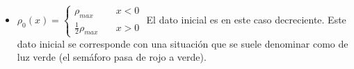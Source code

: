 \begin{ejercicio}
\begin{enumerate}
\begin{itemize}
\begin{figure}[H]
\begin{center}
\begin{tikzpicture}[x=0.75pt,y=0.75pt,yscale=-1,xscale=1]
                    \end{tikzpicture}
                \end{center}
            \end{figure}
            Las líneas amarillas muestran dónde se pueden meter las ondas de rarefacción. La frontera está delimitada por 
            $x = 0$ y por $x = - u_{max} t$. De esta manera, los tramos son $x<-u_{max}t$, $-u_{max} t < x < 0$ y $x > 0$.
            De esta manera, las ondas de rarefacción son:
            $$\rho(t,x) = \begin{cases}
                \frac{1}{2} \rho_{max} \quad& x < -u_{max} t \\
                \frac{x}{t} \quad & -u_{max} t \leq x < 0 \\
                \rho_{max} \quad& x > 0
            \end{cases}$$
            \item $\rho_0(x) = \begin{cases}
                \rho_{max} \quad& x < 0 \\
                \frac{1}{2} \rho_{max} \quad& x > 0
            \end{cases}$
            El dato inicial es en este caso decreciente. Este dato inicial 
            se corresponde con una situación que se suele denominar como de luz verde (el semáforo pasa de rojo a verde). \\


\end{itemize}
\end{enumerate}
\end{ejercicio}
